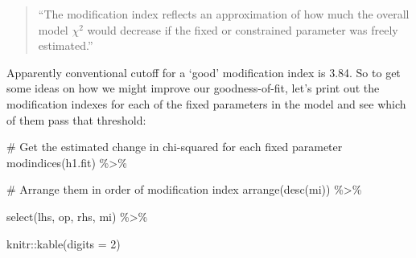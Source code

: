 \documentclass[
  letterpaper,
  DIV=11,
  numbers=noendperiod]{scrreprt}
\newenvironment{Shaded}{\begin{snugshade}}{\end{snugshade}}
\newcommand{\AttributeTok}[1]{\textcolor[rgb]{0.40,0.45,0.13}{#1}}
\newcommand{\CommentTok}[1]{\textcolor[rgb]{0.37,0.37,0.37}{#1}}
\newcommand{\DecValTok}[1]{\textcolor[rgb]{0.68,0.00,0.00}{#1}}
\newcommand{\FunctionTok}[1]{\textcolor[rgb]{0.28,0.35,0.67}{#1}}
\newcommand{\NormalTok}[1]{\textcolor[rgb]{0.00,0.23,0.31}{#1}}
\newcommand{\SpecialCharTok}[1]{\textcolor[rgb]{0.37,0.37,0.37}{#1}}
\begin{document}
\begin{quote}
``The modification index reflects an approximation of how much the
overall model \(χ^2\) would decrease if the fixed or constrained
parameter was freely estimated.''
\end{quote}

Apparently conventional cutoff for a `good' modification index is 3.84.
So to get some ideas on how we might improve our goodness-of-fit, let's
print out the modification indexes for each of the fixed parameters in
the model and see which of them pass that threshold:

\begin{Shaded}
\begin{Highlighting}[]
\CommentTok{\# Get the estimated change in chi{-}squared for each fixed parameter}
\FunctionTok{modindices}\NormalTok{(h1.fit) }\SpecialCharTok{\%\textgreater{}\%} 
  
  \CommentTok{\# Arrange them in order of modification index}
  \FunctionTok{arrange}\NormalTok{(}\FunctionTok{desc}\NormalTok{(mi)) }\SpecialCharTok{\%\textgreater{}\%} 
  
  \FunctionTok{select}\NormalTok{(lhs, op, rhs, mi) }\SpecialCharTok{\%\textgreater{}\%} 
  
\NormalTok{  knitr}\SpecialCharTok{::}\FunctionTok{kable}\NormalTok{(}\AttributeTok{digits =} \DecValTok{2}\NormalTok{)}
\end{Highlighting}
\end{Shaded}
\end{document}
